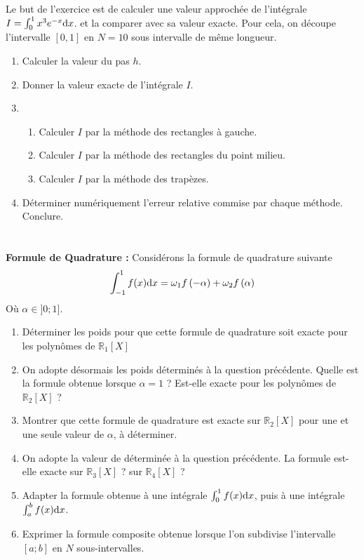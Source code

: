 \documentclass[a4paper]{article}
\def \de {{\rm d}}
\begin{document}
\section{} 
 Le but de l'exercice est de calculer une valeur approchée de l'intégrale $I = \int_0^1x^3e^{-x}\de x$. et la comparer avec sa valeur exacte. Pour cela, on découpe l'intervalle $[0, 1]$ en $N = 10$ sous intervalle
de même longueur.
\begin{enumerate}
\item Calculer la valeur du pas $h$.
\item Donner la valeur exacte de l'intégrale $I$.
\item \begin{enumerate}
\item Calculer $I$ par la méthode des rectangles à gauche.
\item Calculer $I$ par la méthode des rectangles du point milieu.
\item Calculer $I$ par la méthode des trapèzes.
\end{enumerate} 
\item Déterminer numériquement l'erreur relative commise par chaque méthode. Conclure.
\end{enumerate} 


\section{}{\bf Formule de Quadrature : } Considérons la formule de quadrature suivante
\[\int_{-1}^1f(x)\de x=\omega_1f\left(-\alpha \right)+\omega_2f\left(\alpha\right)\]
Où $\alpha \in ]0; 1]$.
\begin{enumerate}
\item  Déterminer les poids pour que cette formule de quadrature soit exacte pour les polynômes de $\mathbb{R}_1[X]$
\item On adopte désormais les poids déterminés à la question précédente. Quelle est la formule obtenue lorsque $\alpha=1$ ? Est-elle exacte pour les polynômes de $\mathbb{R}_2[X]$ ?
\item Montrer que cette formule de quadrature est exacte sur $\mathbb{R}_2[X]$ pour une et une seule valeur de $\alpha$, à déterminer.
\item On adopte la valeur de déterminée à la question précédente. La formule est-elle exacte sur $\mathbb{R}_3[X]$ ? sur $\mathbb{R}_4[X]$ ?
\item  Adapter la formule obtenue à une intégrale $\int_{0}^1f(x)\de x$, puis à une intégrale $\int_{a}^bf(x)\de x$.
\item Exprimer la formule composite obtenue lorsque l'on subdivise l'intervalle $[a; b]$ en $N$ sous-intervalles.
\end{enumerate}
\end{document}
